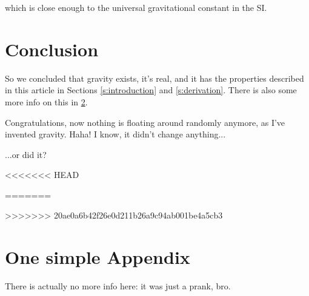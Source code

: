\documentclass[preprint,12pt]{elsarticle}
\begin{document}
\noindent
which is close enough to the universal gravitational constant in the SI.

\section{Conclusion}

So we concluded that gravity exists, it's real, and it has the properties described in this article in Sections \ref{s:introduction} and \ref{s:derivation}. There is also some more info on this in \ref{s:appendix}.

Congratulations, now nothing is floating around randomly anymore, as I've invented gravity. Haha! I know, it didn't change anything...

\noindent
...or did it?

<<<<<<< HEAD

=======
 
>>>>>>> 20ae0a6b42f26e0d211b26a9c94ab001be4a5cb3

\newpage
\appendix
\section{One simple Appendix}\label{s:appendix}

There is actually no more info here: it was just a prank, bro.
\end{document}
